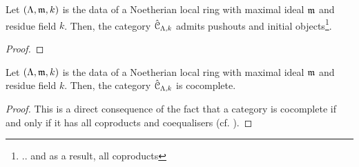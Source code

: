            \begin{proposition} \label{prop: pushouts_and_coproducts_of_completed_artinian_local_algebras}
                Let $(\Lambda, \mathfrak{m}, k)$ is the data of a Noetherian local ring with maximal ideal $\mathfrak{m}$ and residue field $k$. Then, the category $\hat{\mathcal{C}}_{\Lambda, k}$ admits pushouts and initial objects\footnote{.. and as a result, all coproducts}.
            \end{proposition}
                \begin{proof}
                    
                \end{proof}
            \begin{corollary}
                Let $(\Lambda, \mathfrak{m}, k)$ is the data of a Noetherian local ring with maximal ideal $\mathfrak{m}$ and residue field $k$. Then, the category $\hat{\mathcal{C}}_{\Lambda, k}$ is cocomplete.
            \end{corollary}
                \begin{proof}
                    This is a direct consequence of the fact that a category is cocomplete if and only if it has all coproducts and coequalisers (cf. \cite[Theorem V.2.1]{maclane}).
                \end{proof}
                
